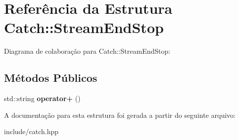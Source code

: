 \hypertarget{structCatch_1_1StreamEndStop}{}\section{Referência da Estrutura Catch\+:\+:Stream\+End\+Stop}
\label{structCatch_1_1StreamEndStop}


Diagrama de colaboração para Catch\+:\+:Stream\+End\+Stop\+:
\subsection*{Métodos Públicos}
\begin{DoxyCompactItemize}
\item 
std\+::string {\bfseries operator+} ()\hypertarget{structCatch_1_1StreamEndStop_a3025092e06c224e0845f2caa07b26d0e}{}\label{structCatch_1_1StreamEndStop_a3025092e06c224e0845f2caa07b26d0e}

\end{DoxyCompactItemize}


A documentação para esta estrutura foi gerada a partir do seguinte arquivo\+:\begin{DoxyCompactItemize}
\item 
include/catch.\+hpp\end{DoxyCompactItemize}
